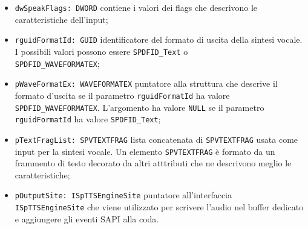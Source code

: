 \begin{itemize}
	\begin{itemize}
		\item \texttt{dwSpeakFlags: DWORD} contiene i valori dei flags che descrivono le caratteristiche dell'input;
		\item \texttt{rguidFormatId: GUID} identificatore del formato di uscita della sintesi vocale. I possibili valori possono essere \texttt{SPDFID\_Text} o\\ \texttt{SPDFID\_WAVEFORMATEX};
		\item \texttt{pWaveFormatEx: WAVEFORMATEX} puntatore alla struttura che descrive il formato d'uscita se il parametro \texttt{rguidFormatId} ha valore\\ \texttt{SPDFID\_WAVEFORMATEX}. L'argomento ha valore \texttt{NULL} se il parametro \texttt{rguidFormatId} ha valore \texttt{SPDFID\_Text};
		\item \texttt{pTextFragList: SPVTEXTFRAG} lista concatenata di \texttt{SPVTEXTFRAG} usata come input per la sintesi vocale. Un elemento \texttt{SPVTEXTFRAG} è formato da un frammento di testo decorato da altri atttributi che ne descrivono meglio le caratteristiche;
		\item \texttt{pOutputSite: ISpTTSEngineSite} puntatore all'interfaccia\\ \texttt{ISpTTSEngineSite} che viene utilizzato per scrivere l'audio nel buffer dedicato e aggiungere gli eventi SAPI alla coda.
	\end{itemize}  
\end{itemize}

